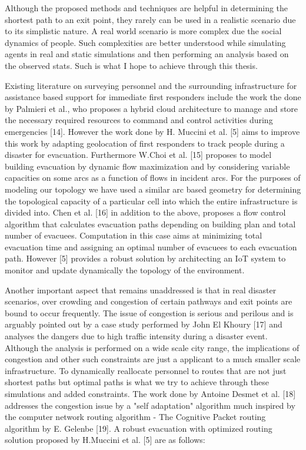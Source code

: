 Although the proposed methods and techniques are helpful in determining the shortest path to an exit point, they rarely can be used in a realistic scenario due to its simplistic nature. A real world scenario is more complex due the social dynamics of people. Such complexities are better understood while simulating agents in real and static simulations and then performing an analysis based on the observed stats. Such is what I hope to achieve through this thesis.

Existing literature on surveying personnel and the surrounding infrastructure for assistance based support for immediate first responders include the work the done by Palmieri et al., who proposes a hybrid cloud architecture to manage and store the necessary required resources to command and control activities during emergencies [14]. However the work done by H. Muccini et al. [5] aims to improve this work by adapting geolocation of first responders to track people during a disaster for evacuation. Furthermore W.Choi et al. [15] proposes to model building evacuation by dynamic flow maximization and by considering variable capacities on some arcs as a function of flows in incident arcs. For the purposes of modeling our topology we have used a similar arc based geometry for determining the topological capacity of a particular cell into which the entire infrastructure is divided into. Chen et al. [16] in addition to the above, proposes a flow control algorithm that calculates evacuation paths depending on building plan and total number of
evacuees. Computation in this case aims at minimizing total evacuation time and assigning an optimal number of evacuees to each evacuation path. However [5] provides a robust solution by architecting an IoT system to monitor and update dynamically the topology of the environment.

Another important aspect that remains unaddressed is that in real disaster scenarios, over crowding and congestion of certain pathways and exit points are bound to occur frequently. The issue of congestion is serious and perilous and is arguably pointed out by a case study performed by John El Khoury [17] and analyses the dangers due to high traffic intensity during a disaster event. Although the analysis is performed on a wide scale city range, the implications of congestion and other such constraints are just a applicant to a much smaller scale infrastructure. To dynamically reallocate personnel to routes that are not just shortest paths but optimal paths is what we try to achieve through these simulations and added constraints. The work done by Antoine Desmet et al. [18] addresses the congestion issue by a "self adaptation" algorithm much inspired by the computer network routing algorithm - The Cognitive Packet routing algorithm by E. Gelenbe [19]. A robust evacuation with optimized routing solution proposed by H.Muccini et al. [5] are as follows:

